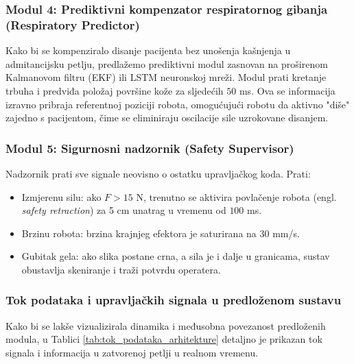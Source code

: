\subsubsection{Modul 4: Prediktivni kompenzator respiratornog gibanja (Respiratory Predictor)}
Kako bi se kompenziralo disanje pacijenta bez unošenja kašnjenja u admitancijsku petlju, predlažemo prediktivni modul zasnovan na proširenom Kalmanovom filtru (EKF) ili LSTM neuronskoj mreži. Modul prati kretanje trbuha i predviđa položaj površine kože za sljedećih $50$ ms. Ova se informacija izravno pribraja referentnoj poziciji robota, omogućujući robotu da aktivno "diše" zajedno s pacijentom, čime se eliminiraju oscilacije sile uzrokovane disanjem.

\subsubsection{Modul 5: Sigurnosni nadzornik (Safety Supervisor)}
Nadzornik prati sve signale neovisno o ostatku upravljačkog koda. Prati:
\begin{itemize}
    \item Izmjerenu silu: ako $F > 15$ N, trenutno se aktivira povlačenje robota (engl. \textit{safety retraction}) za 5 cm unatrag u vremenu od $100$ ms.
    \item Brzinu robota: brzina krajnjeg efektora je saturirana na $30$ mm/s.
    \item Gubitak gela: ako slika postane crna, a sila je i dalje u granicama, sustav obustavlja skeniranje i traži potvrdu operatera.
\end{itemize}

\subsubsection{Tok podataka i upravljačkih signala u predloženom sustavu}
Kako bi se lakše vizualizirala dinamika i međusobna povezanost predloženih modula, u Tablici \ref{tab:tok_podataka_arhitekture} detaljno je prikazan tok signala i informacija u zatvorenoj petlji u realnom vremenu.

